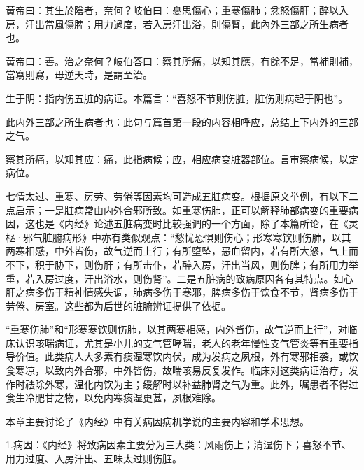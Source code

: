 \documentclass[draft,12pt]{ctexbook}
\begin{document}

\begin{yuanwen}
黃帝曰：其生於陰者，奈何？岐伯曰：憂思傷心；重寒傷肺；忿怒傷肝；醉以入房，汗出當風傷脾；用力過度，若入房汗出浴，則傷腎，此內外三部之所生病者也。

黃帝曰：善。治之奈何？岐伯答曰：察其所痛，以知其應，有餘不足，當補則補，當寫則寫，毋逆天時，是謂至治。
\end{yuanwen}


\begin{jiaozhu}
  \item 生于阴：指内伤五脏的病证。本篇言：“喜怒不节则伤脏，脏伤则病起于阴也”。
  \item 此内外三部之所生病者也：此句与篇首第一段的内容相呼应，总结上下内外的三部之气。
  \item 察其所痛，以知其应：痛，此指病候；应，相应病变脏器部位。言审察病候，以定病位。
\end{jiaozhu}



七情太过、重寒、房劳、劳倦等因素均可造成五脏病变。根据原文举例，有以下二点启示；一是脏病常由内外合邪所致。如重寒伤肺，正可以解释肺部病变的重要病因，这也是《内经》论述五脏病变时比较强调的一个方面，除了本篇所论，在《灵枢·邪气脏腑病形》中亦有类似观点：“愁忧恐惧则伤心；形寒寒饮则伤肺，以其两寒相感，中外皆伤，故气逆而上行；有所堕坠，恶血留内，若有所大怒，气上而不下，积于胁下，则伤肝；有所击仆，若醉入房，汗出当风，则伤脾；有所用力举重，若入房过度，汗出浴水，则伤肾”。二是五脏病的致病原因各有其特点。如心肝之病多伤于精神情感失调，肺病多伤于寒邪，脾病多伤于饮食不节，肾病多伤于劳倦、房室。这些都为后世的脏腑辨证提供了依据。


“重寒伤肺”和“形寒寒饮则伤肺，以其两寒相感，内外皆伤，故气逆而上行”，对临床认识咳喘病证，尤其是小儿的支气管哮喘，老人的老年慢性支气管炎等有重要指导价值。此类病人大多素有痰湿寒饮内伏，成为发病之夙根，外有寒邪相袭，或饮食寒凉，以致内外合邪，中外皆伤，故喘咳易反复发作。临床对这类病证治疗，发作时祛除外寒，温化内饮为主；缓解时以补益肺肾之气为重。此外，嘱患者不得过食生冷肥甘之物，以免内寒痰湿更甚，夙根难除。

\xiaojie

本章主要讨论了《内经》中有关病因病机学说的主要内容和学术思想。

1.病因：《内经》将致病因素主要分为三大类：风雨伤上；清湿伤下；喜怒不节、用力过度、入房汗出、五味太过则伤脏。
\end{document}
